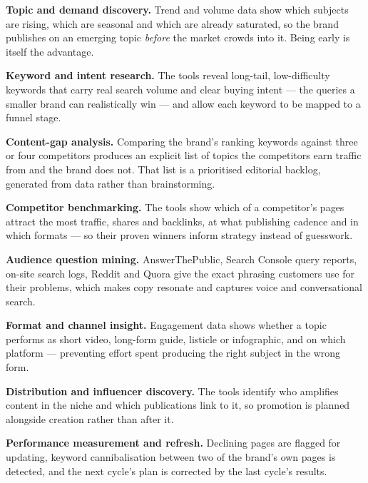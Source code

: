 \begin{qlist}
\begin{apts}
\item \textbf{Topic and demand discovery.} Trend and volume data show which
      subjects are rising, which are seasonal and which are already saturated,
      so the brand publishes on an emerging topic \emph{before} the market
      crowds into it. Being early is itself the advantage.
\item \textbf{Keyword and intent research.} The tools reveal long-tail,
      low-difficulty keywords that carry real search volume and clear buying
      intent --- the queries a smaller brand can realistically win --- and
      allow each keyword to be mapped to a funnel stage.
\item \textbf{Content-gap analysis.} Comparing the brand's ranking keywords
      against three or four competitors produces an explicit list of topics
      the competitors earn traffic from and the brand does not. That list is a
      prioritised editorial backlog, generated from data rather than
      brainstorming.
\item \textbf{Competitor benchmarking.} The tools show which of a competitor's
      pages attract the most traffic, shares and backlinks, at what publishing
      cadence and in which formats --- so their proven winners inform strategy
      instead of guesswork.
\item \textbf{Audience question mining.} AnswerThePublic, Search Console query
      reports, on-site search logs, Reddit and Quora give the exact phrasing
      customers use for their problems, which makes copy resonate and captures
      voice and conversational search.
\item \textbf{Format and channel insight.} Engagement data shows whether a
      topic performs as short video, long-form guide, listicle or infographic,
      and on which platform --- preventing effort spent producing the right
      subject in the wrong form.
\item \textbf{Distribution and influencer discovery.} The tools identify who
      amplifies content in the niche and which publications link to it, so
      promotion is planned alongside creation rather than after it.
\item \textbf{Performance measurement and refresh.} Declining pages are flagged
      for updating, keyword cannibalisation between two of the brand's own
      pages is detected, and the next cycle's plan is corrected by the last
      cycle's results.
\end{apts}


\end{qlist}

